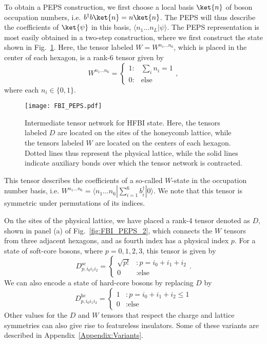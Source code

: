 {To obtain a PEPS construction, we first choose a local basis $\ket{n}$
of boson occupation numbers, i.e. $b^\dagger b \ket{n} = n \ket{n}$.
The PEPS will thus describe the coefficients of $\ket{\psi}$ in this
basis, $\langle n_1 \ldots n_L | \psi \rangle$. The PEPS
representation is most easily obtained in a two-step construction,
where we first construct the state shown in Fig.~\ref{fig:FBI_PEPS}.
Here, the tensor labeled $W=W^{n_1 \ldots n_6}$, which is placed in
the center of each hexagon, is a rank-6 tensor given by
\begin{equation} \label{eq:W}
W^{n_1 \ldots n_6}  = \left\{ \begin{array}{lr}
													1  : & \sum\limits_i n_i = 1 \\
													0  : & \text{else}
													\end{array} \right.,
\end{equation}
where each $n_i \in \{0, 1\}$.

\begin{figure}
	\centering
	\texttt{[image: FBI\_PEPS.pdf]}
	\caption{
	Intermediate tensor network for HFBI state. Here, the tensors labeled
	$D$ are located on the sites of the honeycomb lattice, while the
	tensors labeled $W$ are located on the centers of each hexagon.
	Dotted lines thus represent the physical lattice, while the solid
	lines indicate auxiliary bonds over which the tensor network is
	contracted.}
	\label{fig:FBI_PEPS}
\end{figure}

This tensor describes the coefficients of a so-called $W$-state in the
occupation number basis, i.e. $W^{n_1 \ldots n_6}= \langle n_1
\ldots n_6 | \sum_{i=1}^6 b_i^\dagger |0\rangle$. We note that this
tensor is symmetric under permutations of its indices.

On the sites of the physical lattice, we have placed a rank-4 tensor
denoted as $D$, shown in panel (a) of Fig.~\ref{fig:FBI_PEPS_2}, which
connects the $W$ tensors from three adjacent hexagons, and as fourth
index has a physical index $p$. For a state of soft-core bosons, where
$p=0,1,2,3$, this tensor is given by
\begin{equation} \label{eqn:Dsc}
D^\mathrm{sc}_{p, i_0 i_1 i_2}  = \left\{ \begin{array}{ll}
													\sqrt{p!}  &: p =i_0+i_1+i_2  \\
													0  &:  \text{else}
													\end{array}
											\right. .
\end{equation}
We can also encode a state of hard-core bosons by replacing $D$ by
\begin{equation} \label{eqn:Dhc}
D^\mathrm{hc}_{p, i_0 i_1 i_2}  = \left\{ \begin{array}{ll}
													1  &: p = i_0+i_1+i_2 \le 1  \\
													0  &:  \text{else}
													\end{array}
											\right.
\end{equation}
Other values for the $D$ and $W$ tensors that respect the charge and lattice symmetries
can also give rise to featureless insulators. 
Some of these variants are described in Appendix~\ref{Appendix:Variants}.

}
